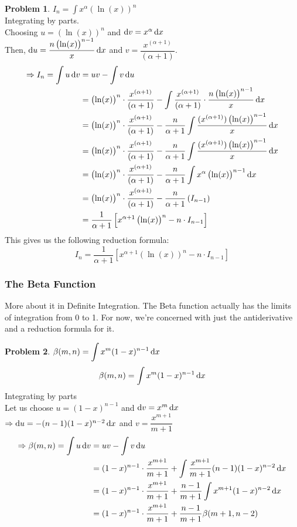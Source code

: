 \documentclass[14]{article}
\theoremstyle{definition}
\newtheorem{prob}{Problem}
\theoremstyle{case}
\begin{document}
\begin{prob}
$I_n = \displaystyle \int x^{\alpha}\left( \ln(x) \right)^n$\\
Integrating by parts.\\
Choosing $u = \left(\ln(x)\right)^n$ and $\dif v = x^{\alpha} \dif x$\\
Then, $\dif u = \dfrac{n \left(\ln(x)\right)^{n-1}}{x} \dif x$ and $v = \dfrac{x^{(\alpha + 1)}}{(\alpha + 1)}$.
\begin{align*}
\Rightarrow I_n = \int u \dif v &= uv - \int v \dif u\\
&= \left(\ln(x)\right)^n \cdot \dfrac{x^{(\alpha + 1)}}{(\alpha + 1)} - \int \dfrac{x^{(\alpha + 1)}}{(\alpha + 1)} \cdot \dfrac{n \left(\ln(x)\right)^{n-1}}{x} \dif x\\
&= \left(\ln(x)\right)^n \cdot \dfrac{x^{(\alpha + 1)}}{(\alpha + 1)} - \dfrac{n}{\alpha + 1}\int \dfrac{(x^{(\alpha + 1)}) \left(\ln(x)\right)^{n-1}}{x} \dif x\\
&= \left(\ln(x)\right)^n \cdot \dfrac{x^{(\alpha + 1)}}{(\alpha + 1)} - \dfrac{n}{\alpha + 1}\int \dfrac{(x^{(\alpha + 1)}) \left(\ln(x)\right)^{n-1}}{x} \dif x\\
&= \left(\ln(x)\right)^n \cdot \dfrac{x^{(\alpha + 1)}}{(\alpha + 1)} - \dfrac{n}{\alpha + 1}\int x^{\alpha} \left(\ln(x)\right)^{n-1} \dif x\\
&= \left(\ln(x)\right)^n \cdot \dfrac{x^{(\alpha + 1)}}{(\alpha + 1)} - \dfrac{n}{\alpha + 1} \left(I_{n-1}\right)\\
&= \dfrac1{\alpha + 1} \left[ x^{\alpha + 1} \left( \ln(x) \right)^n - n \cdot I_{n-1} \right]
\end{align*}
This gives us the following reduction formula:\\
\[I_n = \dfrac1{\alpha + 1} \left[ x^{\alpha + 1} \left( \ln(x) \right)^n - n \cdot I_{n-1} \right]\]
\end{prob}
\pagebreak
\subsubsection*{The Beta Function}
More about it in Definite Integration. The Beta function actually has the limits of integration from 0 to 1. For now, we're concerned with just the antiderivative and a reduction formula for it.
\begin{prob}
$\beta(m, n) = \displaystyle \int x^m (1-x)^{n-1} \dif x$
\[\beta(m, n) = \int x^m (1-x)^{n-1} \dif x\]
Integrating by parts\\
Let us choose $u = (1-x)^{n-1}$ and $\dif v = x^m \dif x$\\
$\Rightarrow \dif u = -(n-1)(1-x)^{n-2} \dif x$ and $v = \dfrac{x^{m+1}}{m+1}$
\begin{align*}
\Rightarrow \beta(m, n) = \int u \dif v &= uv - \int v \dif u\\
&= (1-x)^{n-1} \cdot \dfrac{x^{m+1}}{m+1}+ \int \dfrac{x^{m+1}}{m+1} (n-1)(1-x)^{n-2} \dif x\\
&= (1-x)^{n-1} \cdot \dfrac{x^{m+1}}{m+1}+ \dfrac{n-1}{m+1} \int x^{m+1}(1-x)^{n-2} \dif x\\
&= (1-x)^{n-1} \cdot \dfrac{x^{m+1}}{m+1}+ \dfrac{n-1}{m+1} \beta(m+1, n-2)\\
\end{align*}
\end{prob}
\end{document}
